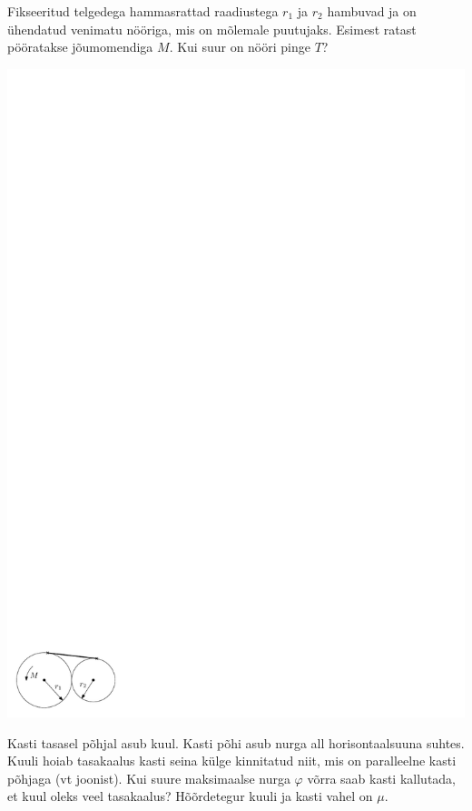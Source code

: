 \documentclass[10pt, twoside]{article}
\begin{document}
{\bigskip


Fikseeritud telgedega hammasrattad raadiustega $r_1$ ja $r_2$ hambuvad ja on
ühendatud venimatu nööriga,
mis on mõlemale puutujaks. Esimest ratast pööratakse
jõumomendiga $M$. Kui suur on nööri pinge $T$?

\begin{center}
	\includegraphics{2010-v3g-04-joonis_hr_ipe.pdf}
\end{center}
\probend
\bigskip


Kasti tasasel põhjal asub kuul. Kasti põhi asub nurga all horisontaalsuuna suhtes. Kuuli hoiab tasakaalus kasti seina külge kinnitatud niit, mis on paralleelne kasti põhjaga (vt joonist). Kui suure maksimaalse nurga $\varphi$ võrra saab kasti kallutada, et kuul oleks veel tasakaalus? Hõõrdetegur kuuli ja kasti vahel on $\mu$.

}
\end{document}
